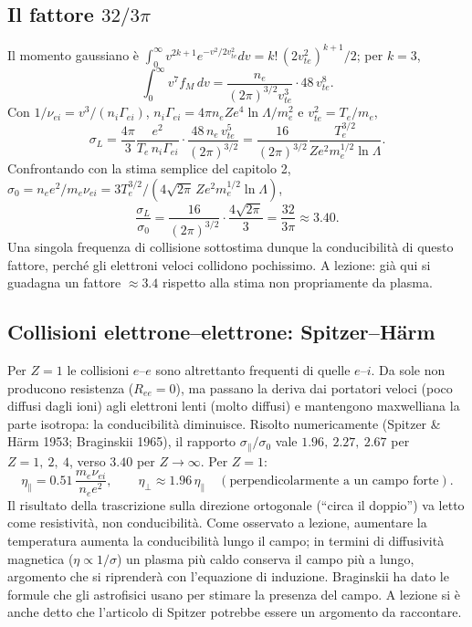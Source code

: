\subsection{Il fattore $32/3\pi$}
Il momento gaussiano è $\int_0^\infty v^{2k+1}e^{-v^2/2v_{te}^2}dv=k!\,(2v_{te}^2)^{k+1}/2$; per $k=3$,
\begin{equation}
\int_0^\infty v^7f_M\,dv=\frac{n_e}{(2\pi)^{3/2}v_{te}^3}\cdot48\,v_{te}^8 .
\end{equation}
Con $1/\nu_{ei}=v^3/(n_i\Gamma_{ei})$, $n_i\Gamma_{ei}=4\pi n_eZe^4\ln\Lambda/m_e^2$ e $v_{te}^2=T_e/m_e$,
\begin{equation}
\sigma_L=\frac{4\pi}{3}\frac{e^2}{T_e\,n_i\Gamma_{ei}}\cdot\frac{48\,n_e\,v_{te}^5}{(2\pi)^{3/2}}=\frac{16}{(2\pi)^{3/2}}\frac{T_e^{3/2}}{Ze^2m_e^{1/2}\ln\Lambda}.
\end{equation}
Confrontando con la stima semplice del capitolo 2, $\sigma_0=n_ee^2/m_e\nu_{ei}=3T_e^{3/2}/(4\sqrt{2\pi}\,Ze^2m_e^{1/2}\ln\Lambda)$,
\begin{equation}
\frac{\sigma_L}{\sigma_0}=\frac{16}{(2\pi)^{3/2}}\cdot\frac{4\sqrt{2\pi}}{3}=\frac{32}{3\pi}\approx3.40 .
\end{equation}
Una singola frequenza di collisione sottostima dunque la conducibilità di questo fattore, perché gli elettroni veloci collidono pochissimo. A lezione: già qui si guadagna un fattore $\approx3.4$ rispetto alla stima non propriamente da plasma.

\subsection{Collisioni elettrone--elettrone: Spitzer--H\"arm}
Per $Z=1$ le collisioni $e$--$e$ sono altrettanto frequenti di quelle $e$--$i$. Da sole non producono resistenza ($R_{ee}=0$), ma passano la deriva dai portatori veloci (poco diffusi dagli ioni) agli elettroni lenti (molto diffusi) e mantengono maxwelliana la parte isotropa: la conducibilità diminuisce. Risolto numericamente (Spitzer \& H\"arm 1953; Braginskii 1965), il rapporto $\sigma_\parallel/\sigma_0$ vale $1.96,\ 2.27,\ 2.67$ per $Z=1,\ 2,\ 4$, verso $3.40$ per $Z\to\infty$. Per $Z=1$:
\begin{equation}
\eta_\parallel=0.51\,\frac{m_e\nu_{ei}}{n_ee^2},\qquad\eta_\perp\approx1.96\,\eta_\parallel\quad(\text{perpendicolarmente a un campo forte}).
\end{equation}
Il risultato della trascrizione sulla direzione ortogonale (``circa il doppio'') va letto come resistività, non conducibilità. Come osservato a lezione, aumentare la temperatura aumenta la conducibilità lungo il campo; in termini di diffusività magnetica ($\eta\propto1/\sigma$) un plasma più caldo conserva il campo più a lungo, argomento che si riprenderà con l'equazione di induzione. Braginskii ha dato le formule che gli astrofisici usano per stimare la presenza del campo. A lezione si è anche detto che l'articolo di Spitzer potrebbe essere un argomento da raccontare.

